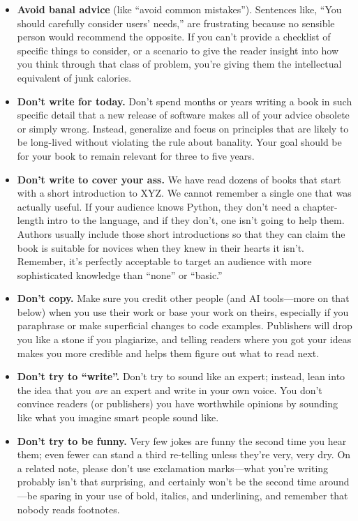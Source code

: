 \documentclass[10pt,letterpaper]{article}
\begin{document}
\begin{itemize}
\item
  \textbf{Avoid banal advice} (like ``avoid common mistakes'').
  Sentences like, ``You should carefully consider users' needs,'' are
  frustrating because no sensible person would recommend the opposite.
  If you can't provide a checklist of specific things to
  consider, or a scenario to give the reader insight into how you think
  through that class of problem, you're giving them the intellectual
  equivalent of junk calories.
\item
  \textbf{Don't write for today.} Don't spend months or years
  writing a book in such specific detail that a new release of software
  makes all of your advice obsolete or simply wrong. Instead, generalize
  and focus on principles that are likely to be long-lived without
  violating the rule about banality. Your goal should be for your book
  to remain relevant for three to five years.
\item
  \textbf{Don't write to cover your ass.} We have read dozens of books
  that start with a short introduction to XYZ. We cannot remember a
  single one that was actually useful. If your audience knows Python,
  they don't need a chapter-length intro to the language, and if they
  don't, one isn't going to help them. Authors usually include those
  short introductions so that they can claim the book is suitable for
  novices when they knew in their hearts it isn't. Remember, it's
  perfectly acceptable to target an audience with more sophisticated
  knowledge than ``none'' or ``basic.''
\item
  \textbf{Don't copy.} Make sure you credit other people (and AI
  tools---more on that below) when you use their work or base your
  work on theirs, especially if you paraphrase or make superficial
  changes to code examples.  Publishers will drop you like a stone if
  you plagiarize, and telling readers where you got your ideas makes
  you more credible and helps them figure out what to read next.
\item
  \textbf{Don't try to ``write''.} Don't try to sound like an
  expert; instead, lean into the idea that you \emph{are} an expert and
  write in your own voice. You don't convince readers (or publishers)
  you have worthwhile opinions by sounding like what you imagine smart
  people sound like.
\item
  \textbf{Don't try to be funny.} Very few jokes are funny the second
  time you hear them; even fewer can stand a third re-telling unless
  they're very, very dry. On a related note, please don't use
  exclamation marks---what you're writing probably isn't that
  surprising, and certainly won't be the second time around---be
  sparing in your use of bold, italics, and underlining, and
  remember that nobody reads footnotes.
\end{itemize}
\end{document}
